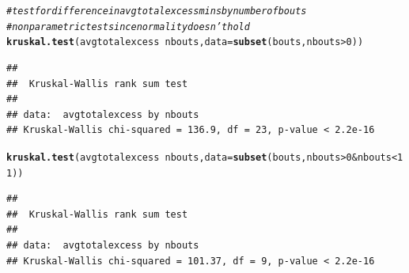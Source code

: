 \documentclass[11pt]{article}\usepackage[]{graphicx}\usepackage[]{color}
\makeatletter
\newcommand{\hlnum}[1]{\textcolor[rgb]{0.686,0.059,0.569}{#1}}%
\newcommand{\hlcom}[1]{\textcolor[rgb]{0.678,0.584,0.686}{\textit{#1}}}%
\newcommand{\hlopt}[1]{\textcolor[rgb]{0,0,0}{#1}}%
\newcommand{\hlstd}[1]{\textcolor[rgb]{0.345,0.345,0.345}{#1}}%
\newcommand{\hlkwc}[1]{\textcolor[rgb]{0.333,0.667,0.333}{#1}}%
\newcommand{\hlkwd}[1]{\textcolor[rgb]{0.737,0.353,0.396}{\textbf{#1}}}%
\newenvironment{kframe}{%
 \def\at@end@of@kframe{}%
 \ifinner\ifhmode%
  \def\at@end@of@kframe{\end{minipage}}%
  \begin{minipage}{\columnwidth}%
 \fi\fi%
 \def\FrameCommand##1{\hskip\@totalleftmargin \hskip-\fboxsep
 \colorbox{shadecolor}{##1}\hskip-\fboxsep
     \hskip-\linewidth \hskip-\@totalleftmargin \hskip\columnwidth}%
 \MakeFramed {\advance\hsize-\width
   \@totalleftmargin\z@ \linewidth\hsize
   \@setminipage}}%
 {\par\unskip\endMakeFramed%
 \at@end@of@kframe}
\newenvironment{knitrout}{}{} %
\makeatother
\begin{document}
\begin{knitrout}
\color{fgcolor}\begin{kframe}
\begin{alltt}
\hlcom{#test for difference in avg total excess mins by number of bouts}
\hlcom{#nonparametric test since normality doesn't hold}
\hlkwd{kruskal.test}\hlstd{(avgtotalexcess}\hlopt{~}\hlstd{nbouts,}\hlkwc{data}\hlstd{=}\hlkwd{subset}\hlstd{(bouts,nbouts}\hlopt{>}\hlnum{0}\hlstd{))}
\end{alltt}
\begin{verbatim}
## 
## 	Kruskal-Wallis rank sum test
## 
## data:  avgtotalexcess by nbouts
## Kruskal-Wallis chi-squared = 136.9, df = 23, p-value < 2.2e-16
\end{verbatim}
\begin{alltt}
\hlkwd{kruskal.test}\hlstd{(avgtotalexcess}\hlopt{~}\hlstd{nbouts,}\hlkwc{data}\hlstd{=}\hlkwd{subset}\hlstd{(bouts,nbouts}\hlopt{>}\hlnum{0}\hlopt{&}\hlstd{nbouts}\hlopt{<}\hlnum{11}\hlstd{))}
\end{alltt}
\begin{verbatim}
## 
## 	Kruskal-Wallis rank sum test
## 
## data:  avgtotalexcess by nbouts
## Kruskal-Wallis chi-squared = 101.37, df = 9, p-value < 2.2e-16
\end{verbatim}
\end{kframe}
\end{knitrout}
\end{document}
